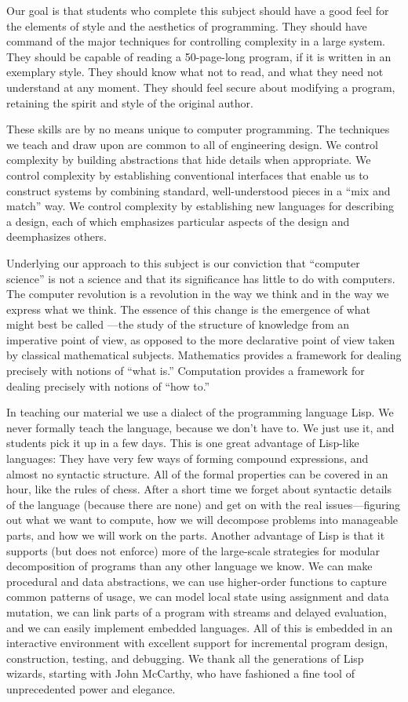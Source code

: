 Our goal is that students who complete this subject should have a good feel for
the elements of style and the aesthetics of programming.  They should have
command of the major techniques for controlling complexity in a large
system. They should be capable of reading a 50-page-long program, if it is
written in an exemplary style. They should know what not to read, and what they
need not understand at any moment.  They should feel secure about modifying a
program, retaining the spirit and style of the original author.

These skills are by no means unique to computer programming.  The techniques we
teach and draw upon are common to all of engineering design.  We control
complexity by building abstractions that hide details when appropriate.  We
control complexity by establishing conventional interfaces that enable us to
construct systems by combining standard, well-understood pieces in a ``mix and
match'' way.  We control complexity by establishing new languages for
describing a design, each of which emphasizes particular aspects of the design
and deemphasizes others.

Underlying our approach to this subject is our conviction that ``computer
science'' is not a science and that its significance has little to do with
computers.  The computer revolution is a revolution in the way we think and in
the way we express what we think.  The essence of this change is the emergence
of what might best be called ---the study of
the structure of knowledge from an imperative point of view, as opposed to the
more declarative point of view taken by classical mathematical subjects.
Mathematics provides a framework for dealing precisely with notions of ``what
is.''  Computation provides a framework for dealing precisely with notions of
``how to.''

In teaching our material we use a dialect of the programming language Lisp.  We
never formally teach the language, because we don't have to.  We just use it,
and students pick it up in a few days.  This is one great advantage of
Lisp-like languages: They have very few ways of forming compound expressions,
and almost no syntactic structure.  All of the formal properties can be covered
in an hour, like the rules of chess.  After a short time we forget about
syntactic details of the language (because there are none) and get on with the
real issues---figuring out what we want to compute, how we will decompose
problems into manageable parts, and how we will work on the parts.  Another
advantage of Lisp is that it supports (but does not enforce) more of the
large-scale strategies for modular decomposition of programs than any other
language we know.  We can make procedural and data abstractions, we can use
higher-order functions to capture common patterns of usage, we can model local
state using assignment and data mutation, we can link parts of a program with
streams and delayed evaluation, and we can easily implement embedded languages.
All of this is embedded in an interactive environment with excellent support
for incremental program design, construction, testing, and debugging.  We thank
all the generations of Lisp wizards, starting with John McCarthy, who have
fashioned a fine tool of unprecedented power and elegance.

